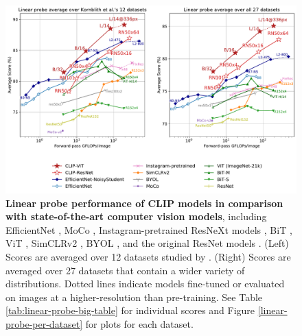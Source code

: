 \documentclass{article}
\begin{document}
\begin{figure}[t]
\includegraphics[width=\textwidth]{linear-probes.pdf}
\vspace{-2em}
\caption{\textbf{Linear probe performance of CLIP models in comparison with state-of-the-art computer vision models}, including EfficientNet \cite{tan2019efficientnet,xie2020self}, MoCo \cite{chen2020mocov2}, Instagram-pretrained ResNeXt models \cite{mahajan2018exploring,touvron2019fixing}, BiT \cite{kolesnikov2019large}, ViT \cite{dosovitskiy2020image}, SimCLRv2 \cite{chen2020big}, BYOL \cite{grill2020byol}, and the original ResNet models \cite{he2016resnet}. (Left) Scores are averaged over 12 datasets studied by \citet{kornblith2019better}. (Right) Scores are averaged over 27 datasets that contain a wider variety of distributions. Dotted lines indicate models fine-tuned or evaluated on images at a higher-resolution than pre-training. See Table \ref{tab:linear-probe-big-table} for individual scores and Figure \ref{linear-probe-per-dataset} for plots for each dataset.}
\label{fig:linear-probe-graph}
\end{figure}
\end{document}
